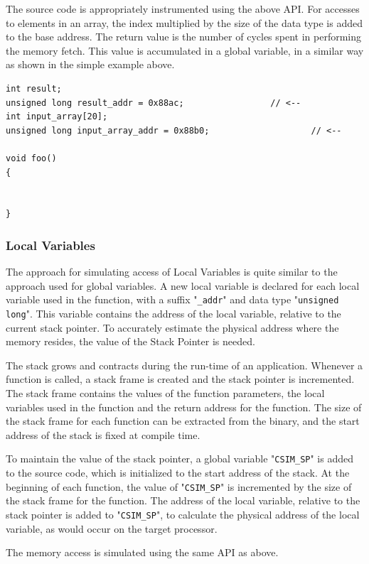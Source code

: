 The source code is appropriately instrumented using the above API. For accesses to elements in an array, the index multiplied by the size of the data type is added to the base address. The return value is the number of cycles spent in performing the memory fetch. This value is accumulated in a global variable, in a similar way as shown in the simple example above.

\begin{lstlisting}
int result;
unsigned long result_addr = 0x88ac;					// <--
int input_array[20];
unsigned long input_array_addr = 0x88b0;					// <--

void foo()
{
	
	
}
\end{lstlisting}

\subsubsection{Local Variables}
The approach for simulating access of Local Variables is quite similar to the approach used for global variables. A new local variable is declared for each local variable used in the function, with a suffix "\texttt{\_addr}" and data type "\texttt{unsigned long}". This variable contains the address of the local variable, relative to the current stack pointer. To accurately estimate the physical address where the memory resides, the value of the Stack Pointer is needed.

The stack grows and contracts during the run-time of an application. Whenever a function is called, a stack frame is created and the stack pointer is incremented. The stack frame contains the values of the function parameters, the local variables used in the function and the return address for the function. The size of the stack frame for each function can be extracted from the binary, and the start address of the stack is fixed at compile time. 

To maintain the value of the stack pointer, a global variable "\texttt{CSIM\_SP}" is added to the source code, which is initialized to the start address of the stack. At the beginning of each function, the value of "\texttt{CSIM\_SP}" is incremented by the size of the stack frame for the function. The address of the local variable, relative to the stack pointer is added to "\texttt{CSIM\_SP}", to calculate the physical address of the local variable, as would occur on the target processor.

The memory access is simulated using the same API as above.

